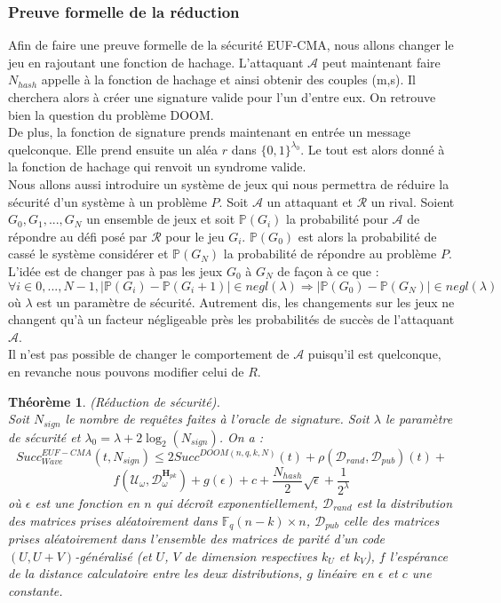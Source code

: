 \documentclass[12pt]{article}
\theoremstyle{plain}
\newtheorem{thm}{Théorème}[section]
\theoremstyle{definition}
\newcommand{\F}{\mathbb{F}}
\begin{document}
\subsubsection{Preuve formelle de la réduction}
Afin de faire une preuve formelle de la sécurité EUF-CMA, nous allons changer le jeu en rajoutant une fonction de hachage. L'attaquant $\mathcal{A}$ peut maintenant faire $N_{hash}$ appelle à la fonction de hachage et ainsi obtenir des couples (m,s). Il cherchera alors à créer une signature valide pour l'un d'entre eux. On retrouve bien la question du problème DOOM. \\
De plus, la fonction de signature prends maintenant en entrée un message quelconque. Elle prend ensuite un aléa $r$ dans $\{0,1\}^{\lambda_0}$. Le tout est alors donné à la fonction de hachage qui renvoit un syndrome valide. \\

\noindent Nous allons aussi introduire un système de jeux qui nous permettra de réduire la sécurité d'un système à un problème $P$. Soit $\mathcal{A}$ un attaquant et $\mathcal{R}$ un rival. Soient $G_0, G_1, ...,G_N$ un ensemble de jeux et soit $\mathbb{P}(G_i)$ la probabilité pour $\mathcal{A}$ de répondre au défi posé par $\mathcal{R}$ pour le jeu $G_i$. $\mathbb{P}(G_0)$ est alors la probabilité de cassé le système considérer et $\mathbb{P}(G_N)$ la probabilité de répondre au problème $P$. \\
L'idée est de changer pas à pas les jeux $G_0$ à $G_N$ de façon à ce que :
$$\forall i \in {0,...,N-1}, |\mathbb{P}(G_i)-\mathbb{P}(G_i+1)| \in negl(\lambda) \Longrightarrow |\mathbb{P}(G_0)-\mathbb{P}(G_N)|  \in negl(\lambda)$$
où $\lambda$ est un paramètre de sécurité. Autrement dis, les changements sur les jeux ne changent qu'à un facteur négligeable près les probabilités de succès de l'attaquant $\mathcal{A}$. \\
Il n'est pas possible de changer le comportement de $\mathcal{A}$ puisqu'il est quelconque, en revanche nous pouvons modifier celui de $R$. \\

\begin{thm} (Réduction de sécurité).\label{DOOM} \\
Soit $N_{sign}$ le nombre de requêtes faites à l'oracle de signature. Soit $\lambda$ le paramètre de sécurité et $\lambda_0=\lambda + 2\log_2(N_{sign})$. On a :
$$Succ^{EUF-CMA}_{Wave}(t,N_{sign}) \leq 2Succ^{DOOM(n,q,k,N)}(t) +\rho(\mathcal{D}_{rand},\mathcal{D}_{pub})(t) + $$
$$ f(\mathcal{U}_{\omega},\mathcal{D}_{\omega}^{\mathbf{H}_{pk}}) + g(\epsilon) + c + \frac{N_{hash}}{2}\sqrt{\epsilon} + \frac{1}{2^{\lambda}}$$
où $\epsilon$ est une fonction en $n$ qui décroît exponentiellement, $\mathcal{D}_{rand}$ est la distribution des matrices prises aléatoirement dans $\F_q{(n-k)\times n}$, $\mathcal{D}_{pub}$ celle des matrices prises aléatoirement dans l'ensemble des matrices de parité d'un code $(U,U+V)$-généralisé (et $U$, $V$ de dimension respectives $k_U$ et $k_V$), $f$ l'espérance de la distance calculatoire entre les deux distributions, $g$ linéaire en $\epsilon$ et $c$ une constante.
\end{thm}
\end{document}
